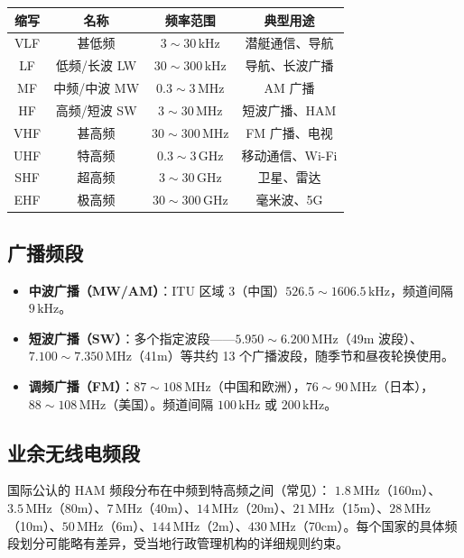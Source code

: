\documentclass[12pt,UTF8]{ctexbook}
\begin{document}
\begin{center}
\begin{tabular}{c|c|c|c}
\hline
\textbf{缩写} & \textbf{名称} & \textbf{频率范围} & \textbf{典型用途} \\
\hline
VLF & 甚低频 & $3\sim30\,\mathrm{kHz}$ & 潜艇通信、导航 \\
LF & 低频/长波 LW & $30\sim300\,\mathrm{kHz}$ & 导航、长波广播 \\
MF & 中频/中波 MW & $0.3\sim3\,\mathrm{MHz}$ & AM 广播 \\
HF & 高频/短波 SW & $3\sim30\,\mathrm{MHz}$ & 短波广播、HAM \\
VHF & 甚高频 & $30\sim300\,\mathrm{MHz}$ & FM 广播、电视 \\
UHF & 特高频 & $0.3\sim3\,\mathrm{GHz}$ & 移动通信、Wi-Fi \\
SHF & 超高频 & $3\sim30\,\mathrm{GHz}$ & 卫星、雷达 \\
EHF & 极高频 & $30\sim300\,\mathrm{GHz}$ & 毫米波、5G \\
\hline
\end{tabular}
\end{center}

\subsection{广播频段}

\begin{itemize}
  \item \textbf{中波广播（MW/AM）}：ITU 区域 3（中国）$526.5\sim1606.5\,\mathrm{kHz}$，频道间隔 $9\,\mathrm{kHz}$。
  \item \textbf{短波广播（SW）}：多个指定波段——$5.950\sim6.200\,\mathrm{MHz}$（49m 波段）、$7.100\sim7.350\,\mathrm{MHz}$（41m）等共约 13 个广播波段，随季节和昼夜轮换使用。
  \item \textbf{调频广播（FM）}：$87\sim108\,\mathrm{MHz}$（中国和欧洲），$76\sim90\,\mathrm{MHz}$（日本），$88\sim108\,\mathrm{MHz}$（美国）。频道间隔 $100\,\mathrm{kHz}$ 或 $200\,\mathrm{kHz}$。
\end{itemize}

\subsection{业余无线电频段}

国际公认的 HAM 频段分布在中频到特高频之间（常见）：
$1.8\,\mathrm{MHz}$（160m）、$3.5\,\mathrm{MHz}$（80m）、$7\,\mathrm{MHz}$（40m）、$14\,\mathrm{MHz}$（20m）、$21\,\mathrm{MHz}$（15m）、$28\,\mathrm{MHz}$（10m）、$50\,\mathrm{MHz}$（6m）、$144\,\mathrm{MHz}$（2m）、$430\,\mathrm{MHz}$（70cm）。每个国家的具体频段划分可能略有差异，受当地行政管理机构的详细规则约束。
\end{document}
